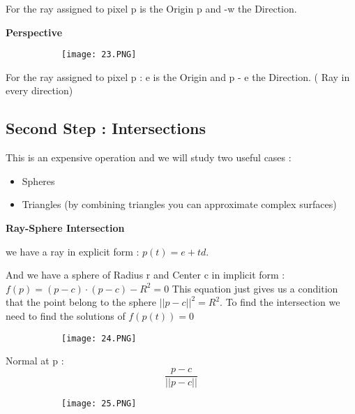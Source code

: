 \documentclass{article}
\begin{document}
For the ray assigned to pixel p is the  Origin p and  -w the Direction.
 
\vspace{3mm}
\textbf{Perspective}

\begin{figure}[ht!]
  \centering
  \begin{subfigure}[b]{0.5\linewidth}
    \texttt{[image: 23.PNG]}
  \end{subfigure}
\end{figure}

For the ray assigned to pixel p : e is the Origin and p - e the Direction. ( Ray in every direction)

\subsection{Second Step : Intersections}
This is an expensive operation and we will study two useful cases : 
\begin{itemize}
    \item Spheres
    \item Triangles (by combining triangles you can approximate complex surfaces)
\end{itemize}

\vspace{3mm}
\textbf{Ray-Sphere Intersection}

we have a ray in explicit form : $p(t) = e + td$. 


\vspace{2mm}
And we have a sphere of Radius r and Center c in implicit form  : $f(p) = (p - c) \cdot (p-c) -R^2 = 0$
This equation just gives us a condition that the point belong to the sphere $||p-c||^2 = R^2$. To find the intersection we need to find the solutions of $f(p(t)) = 0$

\begin{figure}[ht!]
  \centering
  \begin{subfigure}[b]{0.7\linewidth}
    \texttt{[image: 24.PNG]}
  \end{subfigure}
\end{figure}

Normal at p : \[\frac{p - c }{||p - c ||}\]

\begin{figure}[ht!]
  \centering
  \begin{subfigure}[b]{0.7\linewidth}
    \texttt{[image: 25.PNG]}
  \end{subfigure}
\end{figure}
\end{document}
